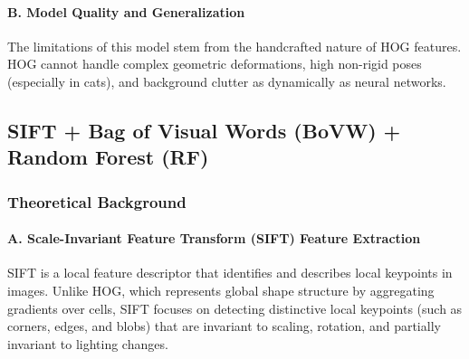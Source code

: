 \documentclass[12pt,a4paper]{article}
\begin{document}
\paragraph{B. Model Quality and Generalization}
The limitations of this model stem from the handcrafted nature of HOG features. HOG cannot handle complex geometric deformations, high non-rigid poses (especially in cats), and background clutter as dynamically as neural networks.

\subsection{SIFT + Bag of Visual Words (BoVW) + Random Forest (RF)}

\subsubsection{Theoretical Background}

\paragraph{A. Scale-Invariant Feature Transform (SIFT) Feature Extraction}
SIFT is a local feature descriptor that identifies and describes local keypoints in images. Unlike HOG, which represents global shape structure by aggregating gradients over cells, SIFT focuses on detecting distinctive local keypoints (such as corners, edges, and blobs) that are invariant to scaling, rotation, and partially invariant to lighting changes.
\end{document}
